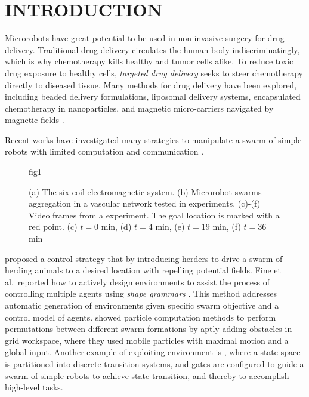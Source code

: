 \section{INTRODUCTION}\label{Intro}

Microrobots have great potential to be used in non-invasive surgery for drug delivery.
Traditional drug delivery circulates the human body indiscriminatingly, which is why chemotherapy kills healthy and tumor cells alike. 
  To reduce toxic drug exposure to healthy cells, \emph{targeted drug delivery} seeks to steer chemotherapy directly to diseased tissue. 
Many methods for drug delivery have been explored, including beaded delivery formulations, liposomal delivery systems, encapsulated chemotherapy in nanoparticles, and magnetic micro-carriers navigated by magnetic fields \cite{tiwari2012drug}. 
  
Recent works have investigated many strategies to manipulate a swarm of simple robots with limited computation and communication  \cite{pierson2015bio, fine2013eliciting,becker2013reconfiguring,bobadilla2011controlling}. %
\begin{figure}[h]
	\centering
	\begin{overpic}[width=1\columnwidth]{fig1}
	\end{overpic}	
	\caption{\label{fig:coil} (a) The six-coil electromagnetic system. (b) Microrobot swarms aggregation in a vascular network tested in experiments. (c)-(f) Video frames from a experiment. The goal location is marked with a red point. (c) $t = 0$ min, (d) $t = 4$ min, (e) $t = 19$ min, (f) $t = 36$ min}
\end{figure}
\cite{pierson2015bio} proposed a control strategy that by introducing herders to drive a swarm of herding animals to a desired location with repelling potential fields. 
Fine et al.\ reported how to actively design environments to assist the process of controlling multiple agents using \textit{shape grammars} \cite{fine2013eliciting}. This method addresses automatic generation of environments given specific swarm objective and a control model of agents.  
\cite{becker2013reconfiguring} showed particle computation methods to perform permutations between different swarm formations by aptly adding obstacles in grid workspace, where they used mobile particles with maximal motion and a global input. 
Another example of exploiting environment is \cite{bobadilla2011controlling}, where a state space is partitioned into discrete transition systems, and gates are configured to guide a swarm of simple robots to achieve state transition, and thereby to accomplish high-level tasks.

